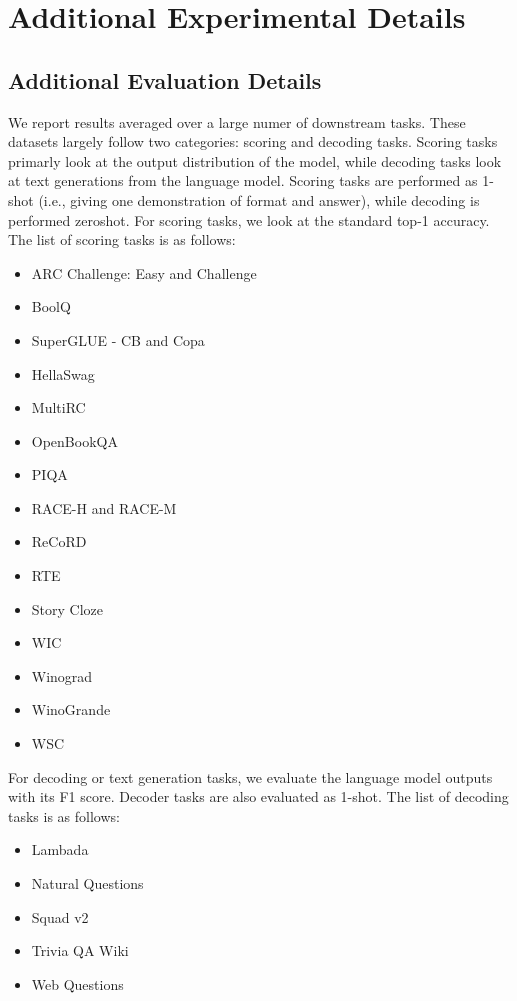 \section{Additional Experimental Details}

\subsection{Additional Evaluation Details}\label{appx:eval_details}

We report results averaged over a large numer of downstream tasks. These datasets largely follow two categories: scoring and decoding tasks. Scoring tasks primarly look at the output distribution of the model, while decoding tasks look at text generations from the language model. Scoring tasks are performed as 1-shot (i.e., giving one demonstration of format and answer), while decoding is performed zeroshot. For scoring tasks, we look at the standard top-1 accuracy. The list of scoring tasks is as follows:

\begin{itemize}
    \item ARC Challenge: Easy and Challenge \citep{allenai:arc} 
    \item BoolQ \citep{clark2019boolq}
    \item SuperGLUE - CB and Copa \citep{wang2019superglue}
    \item HellaSwag \citep{zellers2019hellaswag}
    \item MultiRC \citep{MultiRC2018}
    \item OpenBookQA \citep{OpenBookQA2018}
    \item PIQA \citep{bisk2020piqa}
    \item RACE-H and RACE-M \citep{lai2017race}
    \item ReCoRD \citep{zhang2018record}
    \item RTE \citep{dagan2010recognizing}
    \item Story Cloze \citep{mostafazadeh2016corpus}
    \item WIC \citep{pilehvar2018wic}
    \item Winograd \citep{levesque2012winograd}
    \item WinoGrande \citep{sakaguchi2021winogrande}
    \item WSC \citep{levesque2012winograd}
\end{itemize}

For decoding or text generation tasks, we evaluate the language model outputs with its F1 score. Decoder tasks are also evaluated as 1-shot. The list of decoding tasks is as follows:
\begin{itemize}
    \item Lambada \citep{paperno2016lambada}
    \item Natural Questions \citep{kwiatkowski2019natural}
    \item Squad v2 \citep{rajpurkar2018know}
    \item Trivia QA Wiki \citep{joshi2017triviaqa}
    \item Web Questions \citep{berant2013semantic}
\end{itemize}

